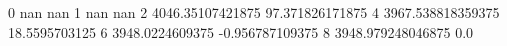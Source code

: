 0 nan nan
1 nan nan
2 4046.35107421875 97.371826171875
4 3967.538818359375 18.5595703125
6 3948.0224609375 -0.956787109375
8 3948.979248046875 0.0
